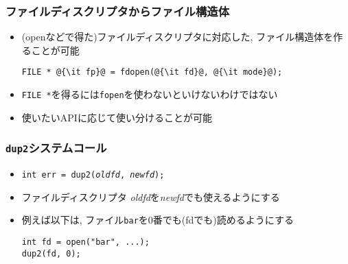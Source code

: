 \documentclass[12pt,dvipdfmx]{beamer}
\begin{document}
\begin{frame}[fragile]
  \frametitle{ファイルディスクリプタからファイル構造体}
  \begin{itemize}
  \item (openなどで得た)ファイルディスクリプタに対応した,
    ファイル構造体を作ることが可能
\begin{lstlisting}
FILE * @{\it fp}@ = fdopen(@{\it fd}@, @{\it mode}@);
\end{lstlisting}
\item {\tt FILE *}を得るには{\tt fopen}を使わないといけないわけではない
  \item 使いたいAPIに応じて使い分けることが可能
  \end{itemize}
\end{frame}

\begin{frame}[fragile]
  \frametitle{{\tt dup2}システムコール}
  \begin{itemize}
  \item {\tt int err = dup2({\it oldfd}, {\it newfd});}
  \item ファイルディスクリプタ {\it oldfd}を{\it newfd}でも使えるようにする
  \item 例えば以下は, ファイル{\tt bar}を0番でも(fdでも)読めるようにする
\begin{lstlisting}
int fd = open("bar", ...);
dup2(fd, 0);      
\end{lstlisting}
  \end{itemize}
\end{frame}
\end{document}
